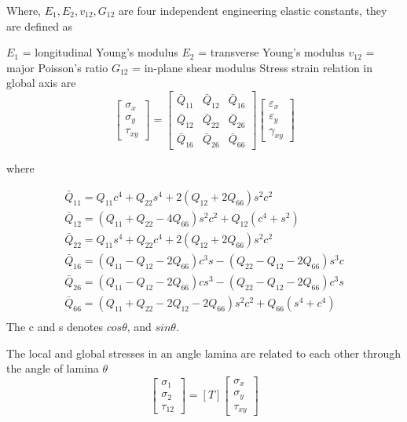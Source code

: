\documentclass[Afour,sageh,times]{sagej}
\begin{document}
Where, $E_1, E_2, v_{12}, G_{12}$ are four independent engineering elastic constants, they are
defined as 

$E_1$ = longitudinal Young's modulus
$E_2$ = transverse  Young's modulus
$v_{12}$ = major Poisson's ratio
$G_{12}$ = in-plane shear modulus 
Stress strain relation in global axis are
\begin{equation}
	\left[\begin{array}{l}\sigma_{x} \\ \sigma_{y} \\ \tau_{x
			y}\end{array}\right]=\left[\begin{array}{lll}\bar{Q}_{11} & \bar{Q}_{12} & \bar{Q}_{16}
			\\ \bar{Q}_{12} & \bar{Q}_{22} & \bar{Q}_{26} \\ \bar{Q}_{16} & \bar{Q}_{26} &
			\bar{Q}_{66}\end{array}\right]\left[\begin{array}{l}\varepsilon_{x} \\ \varepsilon_{y}
	\\ \gamma_{x y}\end{array}\right]
\end{equation}

where

\begin{equation}
	\begin{array}{l}
		\bar{Q}_{11}=Q_{11} c^{4}+Q_{22} s^{4}+2\left(Q_{12}+2 Q_{66}\right) s^{2} c^{2}
		\\ 
		\bar{Q}_{12}=\left(Q_{11}+Q_{22}-4 Q_{66}\right) s^{2} c^{2}+Q_{12}\left(c^{4}+s^{2}\right)
		\\ 
		\bar{Q}_{22}=Q_{11} s^{4}+Q_{22} c^{4}+2\left(Q_{12}+2 Q_{66}\right) s^{2} c^{2} \\

		\bar{Q}_{16}=\left(Q_{11}-Q_{12}-2 Q_{66}\right) c^{3} s-\left(Q_{22}-Q_{12}-2
			Q_{66}\right) s^{3} c \\ 
		\bar{Q}_{26}=\left(Q_{11}-Q_{12}-2 Q_{66}\right) c s^{3}-\left(Q_{22}-Q_{12}-2 Q_{66}\right)
		c^{3} s \\ 
		\bar{Q}_{66}=\left(Q_{11}+Q_{22}-2 Q_{12}-2 Q_{66}\right) s^{2}
		c^{2}+Q_{66}\left(s^{4}+c^{4}\right)\\
	\end{array}
\end{equation}
The c and s denotes $cos\theta$, and $sin\theta$. 


The local and global stresses in an angle lamina are related to each other through the angle of
lamina $\theta$
\begin{equation}
	\left[\begin{array}{l}\sigma_{1} \\ \sigma_{2} \\ \tau_{12
			}\end{array}\right]=[T]\left[\begin{array}{l}\sigma_{x} \\ \sigma_{y} \\
	\tau_{xy}\end{array}\right]
\end{equation}
\end{document}
